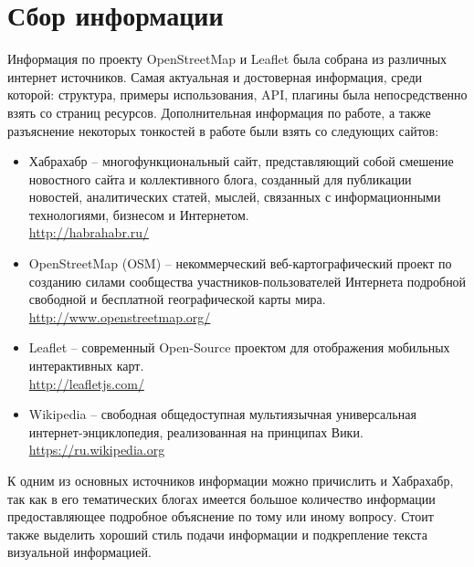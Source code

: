 \documentclass[a4paper, 14pt]{extreport}
\begin{document}
    \chapter{Сбор информации}
    Информация по проекту OpenStreetMap и Leaflet была собрана из различных интернет источников. Самая 
    актуальная и достоверная информация, среди которой: структура, примеры использования, API, плагины 
    была непосредственно взять со страниц ресурсов. Дополнительная информация по работе, а также 
    разъяснение некоторых тонкостей в работе были взять со следующих сайтов:
    \begin{itemize}
        \item Хабрахабр -- многофункциональный сайт, представляющий собой смешение новостного сайта 
            и коллективного блога, созданный для публикации новостей, аналитических статей, мыслей, 
            связанных с информационными технологиями, бизнесом и Интернетом.\\
            \url{http://habrahabr.ru/}
        \item OpenStreetMap (OSM) -- некоммерческий веб-картографический проект по созданию силами 
            сообщества участников-пользователей Интернета подробной свободной и бесплатной 
            географической карты мира.\\
            \url{http://www.openstreetmap.org/}
        \item Leaflet -- современный Open-Source проектом для отображения мобильных 
            интерактивных карт.\\
            \url{http://leafletjs.com/}
        \item Wikipedia -- свободная общедоступная мультиязычная универсальная 
            интернет-энциклопедия, реализованная на принципах Вики.\\
            \url{https://ru.wikipedia.org}
    \end{itemize}
    К одним из основных источников информации можно причислить и Хабрахабр, так как в его тематических 
    блогах имеется большое количество информации предоставляющее подробное объяснение по тому или иному 
    вопросу. Стоит также выделить хороший стиль подачи информации и подкрепление текста визуальной 
    информацией.
\end{document}
